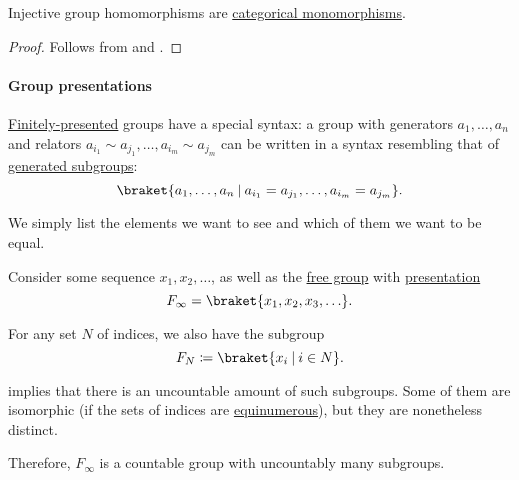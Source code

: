 \begin{corollary}\label{thm:injective_group_homomorphisms_are_monomorphisms}
  Injective group homomorphisms are \hyperref[def:morphism_invertibility/left_cancellative]{categorical monomorphisms}.
\end{corollary}
\begin{proof}
  Follows from  and .
\end{proof}

\paragraph{Group presentations}

\begin{remark}\label{rem:group_presentation_syntax}
  \hyperref[def:object_presentation/cardinality]{Finitely-presented} groups have a special syntax: a group with generators \( a_1, \ldots, a_n \) and relators \( a_{i_1} \sim a_{j_1}, \ldots, a_{i_m} \sim a_{j_m} \) can be written in a syntax resembling that of \hyperref[def:group/generated]{generated subgroups}:
  \begin{equation*}
    \braket{ a_1, \ldots, a_n \given a_{i_1} = a_{j_1}, \ldots, a_{i_m} = a_{j_m} }.
  \end{equation*}

  We simply list the elements we want to see and which of them we want to be equal.
\end{remark}

\begin{example}\label{ex:free_group_with_uncountably_many_subgroups}
  Consider some sequence \( x_1, x_2, \ldots \), as well as the \hyperref[def:free_group]{free group} with \hyperref[rem:group_presentation_syntax]{presentation}
  \begin{equation*}
    F_\infty = \braket{ x_1, x_2, x_3, \ldots }.
  \end{equation*}

  For any set \( N \) of indices, we also have the subgroup
  \begin{equation*}
    F_N \coloneqq \braket{ x_i \given i \in N }.
  \end{equation*}

   implies that there is an uncountable amount of such subgroups. Some of them are isomorphic (if the sets of indices are \hyperref[def:equinumerosity]{equinumerous}), but they are nonetheless distinct.

  Therefore, \( F_\infty \) is a countable group with uncountably many subgroups.
\end{example}

